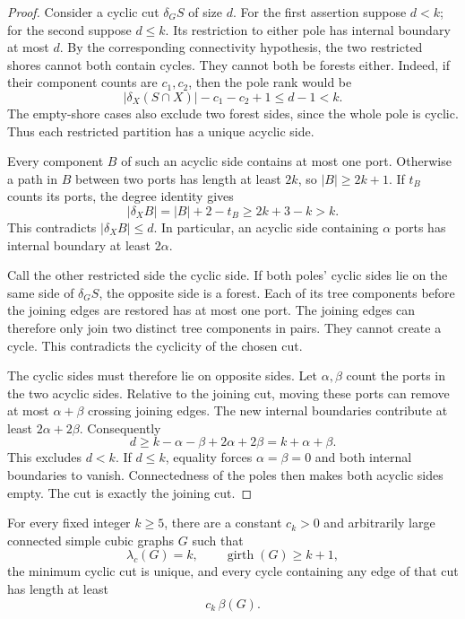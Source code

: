 \begin{proof}
Consider a cyclic cut $\delta_G S$ of size $d$.
For the first assertion suppose $d<k$; for the second suppose $d\le k$.
Its restriction to either pole has internal boundary at most $d$.
By the corresponding connectivity hypothesis, the two restricted shores cannot both contain cycles.
They cannot both be forests either.
Indeed, if their component counts are $c_1,c_2$, then the pole rank would be
\[
 |\delta_X(S\cap X)|-c_1-c_2+1
 \le d-1<k.
\]
The empty-shore cases also exclude two forest sides, since the whole pole is cyclic.
Thus each restricted partition has a unique acyclic side.

Every component $B$ of such an acyclic side contains at most one port.
Otherwise a path in $B$ between two ports has length at least $2k$, so $|B|\ge2k+1$.
If $t_B$ counts its ports, the degree identity gives
\[
 |\delta_X B|=|B|+2-t_B\ge2k+3-k>k.
\]
This contradicts $|\delta_X B|\le d$.
In particular, an acyclic side containing $\alpha$ ports has internal boundary at least $2\alpha$.

Call the other restricted side the cyclic side.
If both poles' cyclic sides lie on the same side of $\delta_G S$, the opposite side is a forest.
Each of its tree components before the joining edges are restored has at most one port.
The joining edges can therefore only join two distinct tree components in pairs.
They cannot create a cycle.
This contradicts the cyclicity of the chosen cut.

The cyclic sides must therefore lie on opposite sides.
Let $\alpha,\beta$ count the ports in the two acyclic sides.
Relative to the joining cut, moving these ports can remove at most $\alpha+\beta$ crossing joining edges.
The new internal boundaries contribute at least $2\alpha+2\beta$.
Consequently
\[
 d\ge k-\alpha-\beta+2\alpha+2\beta
   =k+\alpha+\beta.
\]
This excludes $d<k$.
If $d\le k$, equality forces $\alpha=\beta=0$ and both internal boundaries to vanish.
Connectedness of the poles then makes both acyclic sides empty.
The cut is exactly the joining cut.
\end{proof}

\begin{theorem}
\label{thm:random-long-minimum-cut}
For every fixed integer $k\ge5$, there are a constant $c_k>0$ and arbitrarily large connected simple cubic graphs $G$ such that
\[
 \lambda_c(G)=k,\qquad \operatorname{girth}(G)\ge k+1,
\]
the minimum cyclic cut is unique, and every cycle containing any edge of that cut has length at least
\[
 c_k\,\beta(G).
\]
\end{theorem}

